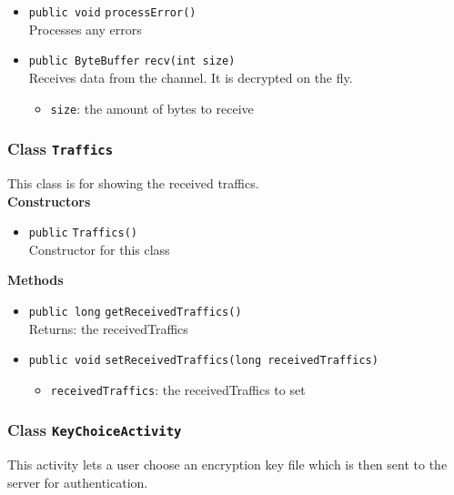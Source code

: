 \begin{itemize}
\item \lstinline|public void| \lstinline|processError|\lstinline|()|\\
Processes any errors



\item \lstinline|public ByteBuffer| \lstinline|recv|\lstinline|(int size)|\\
Receives data from the channel. It is decrypted on the fly.
\begin{itemize}
\item \lstinline|size|: the amount of bytes to receive
\end{itemize}



\end{itemize}

\subsubsection{Class \lstinline|Traffics|}
This class is for showing the received traffics. \\




\textbf{Constructors}
\begin{itemize}
\item \lstinline|public| \lstinline|Traffics|\lstinline|()|\\
Constructor for this class



\end{itemize}


\textbf{Methods}
\begin{itemize}
\item \lstinline|public long| \lstinline|getReceivedTraffics|\lstinline|()|\\
Returns: the receivedTraffics



\item \lstinline|public void| \lstinline|setReceivedTraffics|\lstinline|(long receivedTraffics)|

\begin{itemize}
\item \lstinline|receivedTraffics|: the receivedTraffics to set
\end{itemize}



\end{itemize}

\subsubsection{Class \lstinline|KeyChoiceActivity|}
This activity lets a user choose an encryption key file 
 which is then sent to the server for authentication. \\




